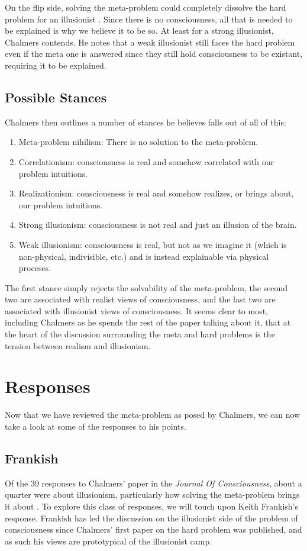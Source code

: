 \documentclass[11pt]{article}
\begin{document}
On the flip side, solving the meta-problem could completely dissolve the hard problem for an illusionist \cite{Dennett2019-WTS}. Since there is no consciousness, all that is needed to be explained is why we believe it to be so. At least for a strong illusionist, Chalmers contends. He notes that a weak illusionist still faces the hard problem even if the meta one is answered since they still hold consciousness to be existant, requiring it to be explained.

\subsection*{Possible Stances}
Chalmers then outlines a number of stances he believes falls out of all of this:
\begin{enumerate}
    \item Meta-problem nihilism: There is no solution to the meta-problem.
    \item Correlationism: consciousness is real and somehow correlated with our problem intuitions.
    \item Realizationism: consciousness is real and somehow realizes, or brings about, our problem intuitions.
    \item Strong illusionism: consciousness is not real and just an illusion of the brain.
    \item Weak illusionism: consciousness is real, but not as we imagine it (which is non-physical, indivisible, etc.) and is instead explainable via physical proceses.
\end{enumerate}

The first stance simply rejects the solvability of the meta-problem, the second two are associated with realist views of consciousness, and the last two are associated with illusionist views of consciousness. It seems clear to most, including Chalmers as he spends the rest of the paper talking about it, that at the heart of the discussion surrounding the meta and hard problems is the tension between realism and illusionism.

\section*{Responses}
Now that we have reviewed the meta-problem as posed by Chalmers, we can now take a look at some of the responses to his points.

\subsection*{Frankish}
Of the 39 responses to Chalmers' paper in the \textit{Journal Of Consciousness}, about a quarter were about illusionism, particularly how solving the meta-problem brings it about \cite{Chalmers2020-HCW}. To explore this class of responses, we will touch upon Keith Frankish's \cite{Frankish2019-TMI} response. Frankish has led the discussion on the illusionist side of the problem of consciousness since Chalmers' first paper on the hard problem was published, and as such his views are prototypical of the illusionist camp.
\end{document}
